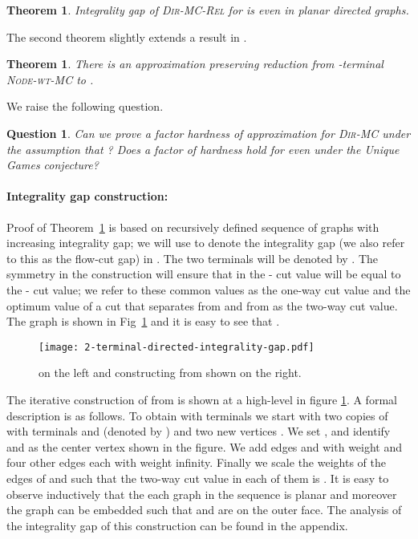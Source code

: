 \documentclass[11pt]{article}
\newtheorem{theorem}[lemma]{Theorem}
\newtheorem{question}{Question}
\def\DirMC{\textsc{Dir-MC}\xspace}
\def\2DirMC{\text{-Bi-Cut}\xspace}
\def\NodeMC{\textsc{Node-wt-MC}\xspace}
\def\DirMCRel{\textsc{Dir-MC-Rel}\xspace}
\def\NodeMC{\textsc{Node-wt-MC}\xspace}
\begin{document}
\begin{theorem}\label{thm:2-terminal-directed-integrality-gap}
  Integrality gap of \DirMCRel for \2DirMC is  even in planar directed
  graphs.
\end{theorem}

The second theorem slightly extends a result in \cite{GargVY04}.

\begin{theorem}
\label{thm:2-terminal-hardness}
  There is an approximation preserving reduction from -terminal
  \NodeMC to \2DirMC.
\end{theorem}

We raise the following question.

\begin{question}
  Can we prove a factor  hardness of approximation for \DirMC under
  the assumption that ? Does a factor of  hardness hold
  for \2DirMC even under the Unique Games conjecture?
\end{question}

\paragraph{Integrality gap construction:} 
Proof of Theorem~\ref{thm:2-terminal-directed-integrality-gap}
is based on recursively defined sequence of graphs
 with increasing integrality gap; we will use
 to denote the integrality gap (we also refer to this
as the flow-cut gap) in .  The two terminals
will be denoted by . The symmetry in the construction will ensure
that in  the - cut value will be equal to the - cut
value; we refer to these common values as the one-way cut value and
the optimum value of a cut that separates  from  and  from
 as the two-way cut value. The graph  is shown in
Fig~\ref{fig:gap} and it is easy to see that .

\begin{figure}[htb]
\centering
\texttt{[image: 2-terminal-directed-integrality-gap.pdf]}
\caption{ on the left and constructing  from  shown
on the right.}
\label{fig:gap}
\end{figure}

The iterative construction of  from  is shown at a
high-level in figure \ref{fig:gap}. A formal description is as
follows. To obtain  with terminals  we start with two
copies of  with terminals  and  (denoted 
by ) and two new vertices . We set ,  and
identify  and  as the center vertex  shown in the
figure. We add edges  and  with weight  and four
other edges  each with weight
infinity. Finally we scale the weights of the edges of  and 
such that the two-way cut value in each of them is
. It is easy to observe inductively that
the each graph in the sequence is planar and moreover the graph can be
embedded such that  and  are on the outer face.  The analysis of
the integrality gap of this construction can be found in the appendix.
\end{document}
